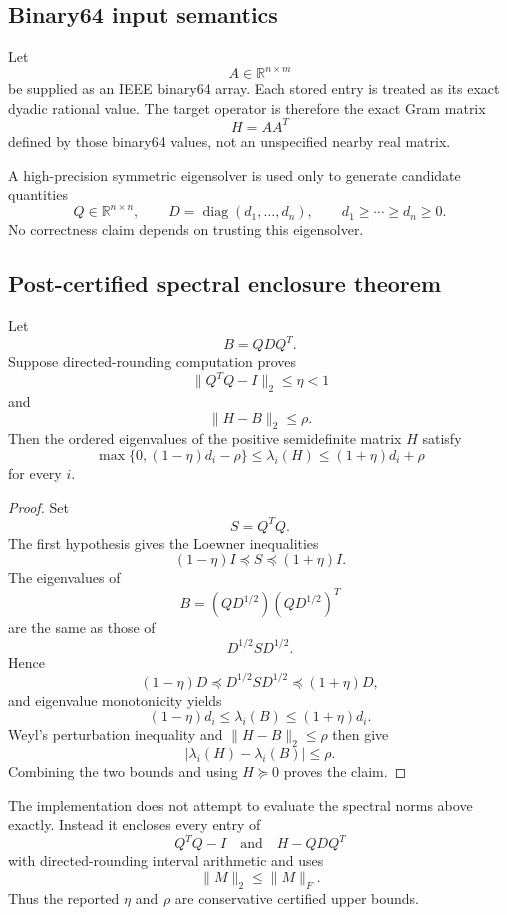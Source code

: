 \subsection{Binary64 input semantics}

Let
\[
A\in\mathbb R^{n\times m}
\]
be supplied as an IEEE binary64 array.  Each stored entry is treated as its
exact dyadic rational value.  The target operator is therefore the exact Gram
matrix
\[
H=AA^T
\]
defined by those binary64 values, not an unspecified nearby real matrix.

A high-precision symmetric eigensolver is used only to generate candidate
quantities
\[
Q\in\mathbb R^{n\times n},
\qquad
D=\operatorname{diag}(d_1,\ldots,d_n),
\qquad
d_1\ge\cdots\ge d_n\ge0.
\]
No correctness claim depends on trusting this eigensolver.

\subsection{Post-certified spectral enclosure theorem}

\begin{theorem}\label{claim:final-6-1}
Let
\[
B=QDQ^T.
\]
Suppose directed-rounding computation proves
\[
\|Q^TQ-I\|_2\le\eta<1
\]
and
\[
\|H-B\|_2\le\rho.
\]
Then the ordered eigenvalues of the positive semidefinite matrix \(H\) satisfy
\[
\boxed{
\max\{0,(1-\eta)d_i-\rho\}
\le
\lambda_i(H)
\le
(1+\eta)d_i+\rho
}
\]
for every \(i\).
\end{theorem}

\begin{proof}
Set
\[
S=Q^TQ.
\]
The first hypothesis gives the Loewner inequalities
\[
(1-\eta)I\preceq S\preceq(1+\eta)I.
\]
The eigenvalues of
\[
B=(QD^{1/2})(QD^{1/2})^T
\]
are the same as those of
\[
D^{1/2}SD^{1/2}.
\]
Hence
\[
(1-\eta)D
\preceq
D^{1/2}SD^{1/2}
\preceq
(1+\eta)D,
\]
and eigenvalue monotonicity yields
\[
(1-\eta)d_i
\le
\lambda_i(B)
\le
(1+\eta)d_i.
\]
Weyl's perturbation inequality and
\(\|H-B\|_2\le\rho\) then give
\[
|\lambda_i(H)-\lambda_i(B)|\le\rho.
\]
Combining the two bounds and using \(H\succeq0\) proves the claim.
\end{proof}

The implementation does not attempt to evaluate the spectral norms above
exactly.  Instead it encloses every entry of
\[
Q^TQ-I
\quad\text{and}\quad
H-QDQ^T
\]
with directed-rounding interval arithmetic and uses
\[
\|M\|_2\le\|M\|_F.
\]
Thus the reported \(\eta\) and \(\rho\) are conservative certified upper
bounds.

